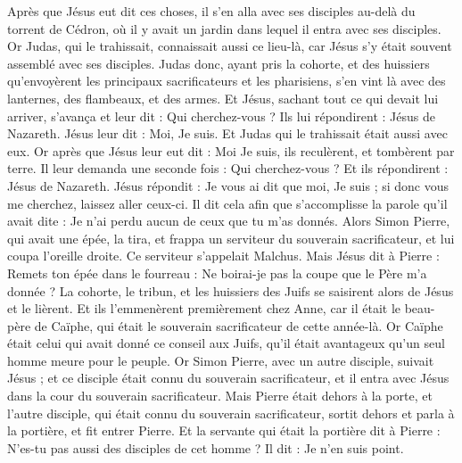 \begin{multicols}{2}
\VerseOne{}Après que Jésus eut dit ces choses, il s'en alla avec ses disciples au-delà du torrent de Cédron, où il y avait un jardin dans lequel il entra avec ses disciples.
Or Judas, qui le trahissait, connaissait aussi ce lieu-là, car Jésus s'y était souvent assemblé avec ses disciples.
Judas donc, ayant pris la cohorte, et des huissiers qu'envoyèrent les principaux sacrificateurs et les pharisiens, s'en vint là avec des lanternes, des flambeaux, et des armes.
Et Jésus, sachant tout ce qui devait lui arriver, s'avança et leur dit : Qui cherchez-vous ?
Ils lui répondirent : Jésus de Nazareth. Jésus leur dit : Moi, Je suis. Et Judas qui le trahissait était aussi avec eux.
Or après que Jésus leur eut dit : Moi Je suis, ils reculèrent, et tombèrent par terre.
Il leur demanda une seconde fois : Qui cherchez-vous ? Et ils répondirent : Jésus de Nazareth.
Jésus répondit : Je vous ai dit que moi, Je suis ; si donc vous me cherchez, laissez aller ceux-ci.
Il dit cela afin que s'accomplisse la parole qu'il avait dite : Je n'ai perdu aucun de ceux que tu m'as donnés.
Alors Simon Pierre, qui avait une épée, la tira, et frappa un serviteur du souverain sacrificateur, et lui coupa l'oreille droite. Ce serviteur s'appelait Malchus.
Mais Jésus dit à Pierre : Remets ton épée dans le fourreau : Ne boirai-je pas la coupe que le Père m'a donnée ?
La cohorte, le tribun, et les huissiers des Juifs se saisirent alors de Jésus et le lièrent.
Et ils l'emmenèrent premièrement chez Anne, car il était le beau-père de Caïphe, qui était le souverain sacrificateur de cette année-là.
Or Caïphe était celui qui avait donné ce conseil aux Juifs, qu'il était avantageux qu'un seul homme meure pour le peuple.
Or Simon Pierre, avec un autre disciple, suivait Jésus ; et ce disciple était connu du souverain sacrificateur, et il entra avec Jésus dans la cour du souverain sacrificateur.
Mais Pierre était dehors à la porte, et l'autre disciple, qui était connu du souverain sacrificateur, sortit dehors et parla à la portière, et fit entrer Pierre.
Et la servante qui était la portière dit à Pierre : N'es-tu pas aussi des disciples de cet homme ? Il dit : Je n'en suis point.

\end{multicols}
